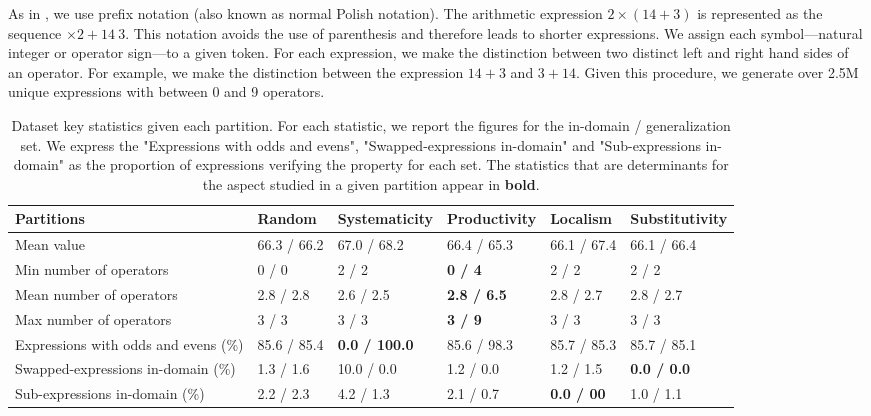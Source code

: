 
As in \textcite{lample_20}, we use prefix notation (also known as normal Polish notation). The arithmetic expression $2 \times (14 + 3)$ is represented as the sequence $\times 2 + 14 \: 3$. This notation avoids the use of parenthesis and therefore leads to shorter expressions. We assign each symbol—natural integer or operator sign—to a given token. For each expression, we make the distinction between two distinct left and right hand sides of an operator. For example, we make the distinction between the expression $14 + 3$ and $3 + 14$. Given this procedure, we generate over 2.5M unique expressions with between 0 and 9 operators.

\begin{table}[t]
    \footnotesize
    \begin{tabularx}{16cm}{l|YYYYY}
    \toprule
    \textbf{Partitions} & \textbf{Random} & \textbf{Systematicity} & \textbf{Productivity} & \textbf{Localism} & \textbf{Substitutivity} \\
    \midrule
    Mean value & 66.3 / 66.2 & 67.0 / 68.2 & 66.4 / 65.3 & 66.1 / 67.4 & 66.1 / 66.4 \\
    Min number of operators & 0 / 0 & 2 / 2 & \textbf{0 / 4} & 2 / 2 & 2 / 2 \\
    Mean number of operators & 2.8 / 2.8 & 2.6 / 2.5 & \textbf{2.8 / 6.5} & 2.8 / 2.7 & 2.8 / 2.7 \\
    Max number of operators & 3 / 3 & 3 / 3 & \textbf{3 / 9} & 3 / 3 & 3 / 3 \\
    \addlinespace
    Expressions with odds and evens (\%) & 85.6 / 85.4 & \textbf{0.0 / 100.0} & 85.6 / 98.3 & 85.7 / 85.3 & 85.7 / 85.1 \\
    Swapped-expressions in-domain (\%) & 1.3 / 1.6 & 10.0 / 0.0 & 1.2 / 0.0 & 1.2 / 1.5 & \textbf{0.0 / 0.0} \\
    Sub-expressions in-domain (\%) & 2.2 / 2.3 & 4.2 / 1.3 & 2.1 / 0.7 & \textbf{0.0 / 00} & 1.0 / 1.1 \\
    \bottomrule
    \end{tabularx}
    \caption{Dataset key statistics given each partition. For each statistic, we report the figures for the in-domain / generalization set. We express the "Expressions with odds and evens", "Swapped-expressions in-domain" and "Sub-expressions in-domain" as the proportion of expressions verifying the property for each set. The statistics that are determinants for the aspect studied in a given partition appear in \textbf{bold}.}
    \label{table:paritions}
\end{table}


